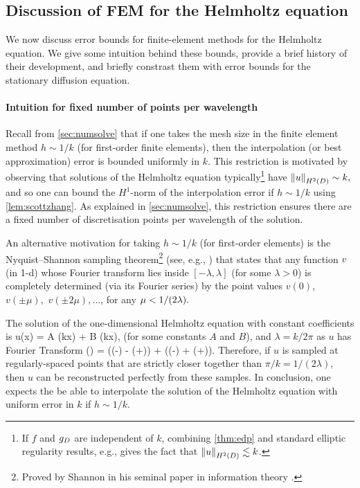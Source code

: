 \subsection{Discussion of FEM for the Helmholtz equation}\label{sec:helmfedisc}

We now discuss error bounds for finite-element methods for the Helmholtz equation. We  give some intuition behind these bounds, provide a brief history of their development, and briefly constrast them with error bounds for the stationary diffusion equation.

\paragraph{Intuition for fixed number of points per wavelength} Recall from \cref{sec:numsolve} that if one takes the mesh size in the finite element method $h \sim 1/k$ (for first-order finite elements), then the interpolation (or best approximation) error is bounded uniformly in $k$. This restriction is motivated by observing that solutions of the Helmholtz equation typically\footnote{If $f$ and $g_{D}$ are independent of $k$,  combining \cref{thm:edp} and standard elliptic regularity results, e.g., \cite[Theorems 4.16 and 4.18]{Mc:00} gives the fact that $\NHtD{u} \lesssim k$.} have $\NHtD{u} \sim k,$ and so one can bound the $H^1$-norm of the interpolation error if $h \sim 1/k$ using \cref{lem:scottzhang}.  As explained in \cref{sec:numsolve}, this restriction ensures there are a fixed number of discretisation points per wavelength of the solution.

An alternative motivation for taking $h \sim 1/k$ (for first-order elements) is the Nyquist--Shannon sampling theorem\footnote{Proved by Shannon in his seminal paper in information theory \cite[Theorem 1]{Sh:49}.} (see, e.g., \cite[\S 5.21]{BaNaBe:00}) that states that any function $v$ (in 1-d) whose Fourier transform lies inside $[-\lambda,\lambda]$ (for some $\lambda >0$) is completely determined (via its Fourier series) by the point values $v(0)$, $v(\pm \mu),$ $v(\pm2\mu),  \ldots$, for any $\mu < 1/\mleft(2\lambda\mright).$

The solution of the one-dimensional Helmholtz equation with constant coefficients is
\beq\label{eq:hh-1d}
u(x) = A \sin(kx) + B \cos(kx),
\eeq
(for some constants $A$ and $B$), and $\lambda = k/2\pi$ as $u$ has Fourier Transform
\beqs
\uhat(\xi) =  \mleft(\delta\mleft(\xi-\mright) - \delta\mleft(\xi+\mright)\mright) +  \mleft(\delta\mleft(\xi-\mright) + \delta\mleft(\xi+\mright)\mright).
\eeqs
{}
Therefore, if $u$ is sampled at regularly-spaced points that are strictly closer together than $\pi/k = 1/(2\lambda)$, then $u$ can be reconstructed perfectly from these samples. In conclusion, one expects the be able to interpolate the solution of the Helmholtz equation with uniform error in $k$ if $h \sim 1/k.$

